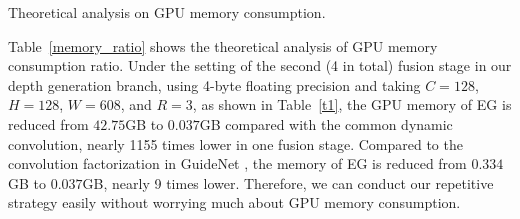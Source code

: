 \documentclass[runningheads]{llncs}
\begin{document}
\begin{table}[t]
\centering
\begin{minipage}{0.48\linewidth}
\Large
{}
\caption{Theoretical analysis on GPU memory consumption.}\label{memory_ratio}
\end{minipage}
\begin{minipage}{0.48\linewidth}  
\tiny
{}
\caption{Numerical analysis on GPU memory consumption.}\label{t1}
\end{minipage}
\end{table}


Table~\ref{memory_ratio} shows the theoretical analysis of GPU memory consumption ratio. Under the setting of the second (4 in total) fusion stage in our depth generation branch, using 4-byte floating precision and taking $C=128$, $H=128$, $W=608$, and $R=3$, as shown in Table~\ref{t1}, the GPU memory of EG is reduced from $42.75$GB to $0.037$GB compared with the common dynamic convolution, nearly 1155 times lower in one fusion stage. Compared to the convolution factorization in GuideNet \cite{tang2020learning}, the memory of EG is reduced from $0.334$GB to $0.037$GB, nearly 9 times lower. Therefore, we can conduct our repetitive strategy easily without worrying much about GPU memory consumption.
\vspace{-15pt}
\end{document}
